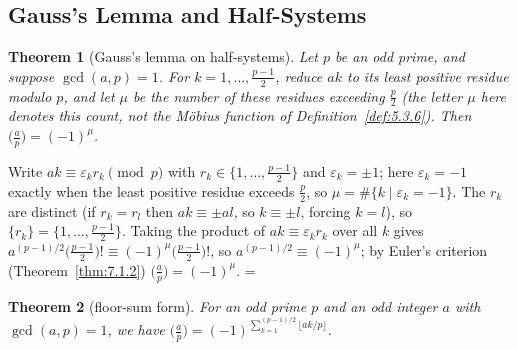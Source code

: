 \documentclass[11pt]{article}
\makeatletter
\theoremstyle{ntstyle}
\newtheorem{theorem}{Theorem}[subsection]
\let\nt@closedisplay\]
\def\nt@guardedclose{\@ifnextchar\par{\nt@closeafterpar}{\@ifnextchar\end{\postdisplaypenalty\@M\nt@closedisplay}{\nt@closedisplay}}}
\def\nt@closeafterpar\par{\@ifnextchar\par{\nt@closeafterpar}{\@ifnextchar\end{\postdisplaypenalty\@M\nt@closedisplay\par}{\nt@closedisplay\par}}}
\renewenvironment{proof}[1][\proofname]{\par
  \pushQED{\qed}\normalfont\topsep\medskipamount\edef\nt@afterproof{\@endparpenalty=\the\@endparpenalty\relax}\@beginparpenalty\@M\@endparpenalty\@M\let\]\nt@guardedclose\trivlist\item[]\textit{#1\@addpunct{.}} \ignorespaces}{\ifvmode\addpenalty\@M\fi\popQED\nt@afterproof\endtrivlist\@endpefalse}
\newcommand{\legs}[2]{\bigl(\tfrac{#1}{#2}\bigr)}
\makeatother
\begin{document}
\subsection{Gauss's Lemma and Half-Systems}
\begin{theorem}[Gauss's lemma on half-systems]\label{thm:7.3.1} Let $p$ be an odd
	prime, and suppose $\gcd(a, p) = 1$. For $k = 1, \ldots, \tfrac{p-1}{2}$,
	reduce $ak$ to its least positive residue modulo $p$, and let $\mu$
	be the number of these residues exceeding $\tfrac{p}{2}$ (the letter
	$\mu$ here denotes this count, not the M{\"o}bius function of
	Definition~\ref{def:5.3.6}). Then
	$\legs{a}{p} = (-1)^{\mu}$.
\end{theorem}

\begin{proof} Write $ak \equiv \varepsilon_k r_k \pmod{p}$
	with $r_k \in \{1, \ldots, \tfrac{p-1}{2}\}$ and $\varepsilon_k = \pm
		1$; here $\varepsilon_k = -1$ exactly when the least positive residue exceeds
	$\tfrac{p}{2}$, so $\mu = \#\{k \mid \varepsilon_k = -1\}$. The $r_k$
	are distinct (if $r_k = r_l$ then $ak \equiv \pm al$, so $k \equiv
		\pm l$, forcing $k = l$), so $\{r_k\} = \{1, \ldots,
		\tfrac{p-1}{2}\}$. Taking the product of $ak \equiv \varepsilon_k
		r_k$ over all $k$ gives $a^{(p-1)/2}\big(\tfrac{p-1}{2}\big)! \equiv
		(-1)^{\mu}\big(\tfrac{p-1}{2}\big)!$, so $a^{(p-1)/2} \equiv
		(-1)^{\mu}$; by Euler's criterion (Theorem~\ref{thm:7.1.2}) $\legs{a}{p} =
		(-1)^{\mu}$.
\end{proof}
\begin{theorem}[floor-sum form]\label{thm:7.3.2} For an odd prime $p$
	and an odd integer $a$ with $\gcd(a, p) = 1$, we have $\legs{a}{p} =
		(-1)^{\sum_{k=1}^{(p-1)/2} \lfloor ak/p \rfloor}$.
\end{theorem}
\end{document}

